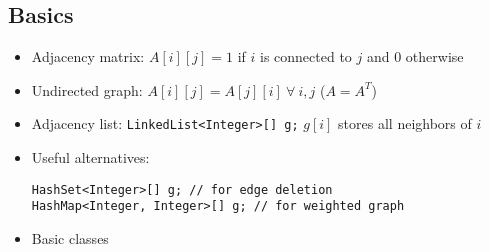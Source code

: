 \subsection{Basics}
\begin{itemize}
\item Adjacency matrix: $A[i][j] = 1$ if $i$ is connected to $j$ and $0$ otherwise
\item Undirected graph: $A[i][j] = A[j][i]\ \forall\ i,j$ ($A = A^T$)
\item Adjacency list: \lstinline|LinkedList<Integer>[] g;|
$g[i]$ stores all neighbors of $i$
\item Useful alternatives: 
\begin{lstlisting}
HashSet<Integer>[] g; // for edge deletion
HashMap<Integer, Integer>[] g; // for weighted graph
\end{lstlisting}
\item Basic classes

\end{itemize}